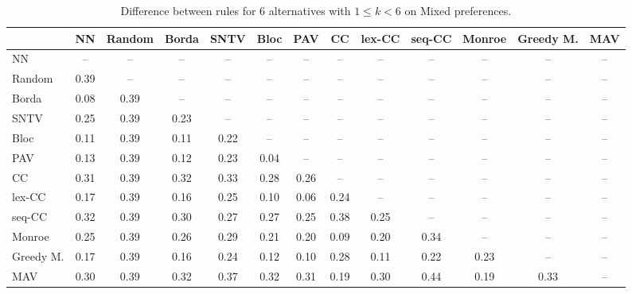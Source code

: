 
\begin{table*}[h!]
\centering
\begin{tabular}{lcccccccccccc}
\toprule
 & NN & Random & Borda & SNTV & Bloc & PAV & CC & lex-CC & seq-CC & Monroe & Greedy M. & MAV \\
\midrule
NN & -- & -- & -- & -- & -- & -- & -- & -- & -- & -- & -- & -- \\
Random & 0.39 & -- & -- & -- & -- & -- & -- & -- & -- & -- & -- & -- \\
Borda & 0.08 & 0.39 & -- & -- & -- & -- & -- & -- & -- & -- & -- & -- \\
SNTV & 0.25 & 0.39 & 0.23 & -- & -- & -- & -- & -- & -- & -- & -- & -- \\
Bloc & 0.11 & 0.39 & 0.11 & 0.22 & -- & -- & -- & -- & -- & -- & -- & -- \\
PAV & 0.13 & 0.39 & 0.12 & 0.23 & 0.04 & -- & -- & -- & -- & -- & -- & -- \\
CC & 0.31 & 0.39 & 0.32 & 0.33 & 0.28 & 0.26 & -- & -- & -- & -- & -- & -- \\
lex-CC & 0.17 & 0.39 & 0.16 & 0.25 & 0.10 & 0.06 & 0.24 & -- & -- & -- & -- & -- \\
seq-CC & 0.32 & 0.39 & 0.30 & 0.27 & 0.27 & 0.25 & 0.38 & 0.25 & -- & -- & -- & -- \\
Monroe & 0.25 & 0.39 & 0.26 & 0.29 & 0.21 & 0.20 & 0.09 & 0.20 & 0.34 & -- & -- & -- \\
Greedy M. & 0.17 & 0.39 & 0.16 & 0.24 & 0.12 & 0.10 & 0.28 & 0.11 & 0.22 & 0.23 & -- & -- \\
MAV & 0.30 & 0.39 & 0.32 & 0.37 & 0.32 & 0.31 & 0.19 & 0.30 & 0.44 & 0.19 & 0.33 & -- \\
\bottomrule
\end{tabular}

\caption{Difference between rules for 6 alternatives with $1 \leq k < 6$ on Mixed preferences.}
\end{table*}
